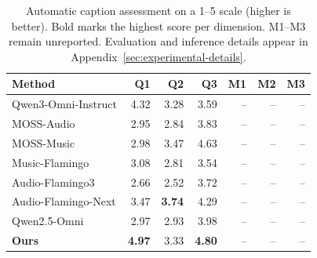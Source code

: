 \begin{table}[t]
\centering
\caption{Automatic caption assessment on a 1--5 scale (higher is better). Bold marks the highest score per dimension. M1--M3 remain unreported. Evaluation and inference details appear in Appendix~\ref{sec:experimental-details}.}
\label{tab:refinement-d123}
\begingroup\small
\setlength{\tabcolsep}{5pt}
\renewcommand{\arraystretch}{1.10}
\begin{tabular*}{\textwidth}{@{\extracolsep{\fill}}lrrrrrr@{}}
\toprule
Method & Q1 & Q2 & Q3 & M1 & M2 & M3 \\
\midrule
Qwen3-Omni-Instruct & 4.32 & 3.28 & 3.59 & -- & -- & -- \\
MOSS-Audio & 2.95 & 2.84 & 3.83 & -- & -- & -- \\
MOSS-Music & 2.98 & 3.47 & 4.63 & -- & -- & -- \\
Music-Flamingo & 3.08 & 2.81 & 3.54 & -- & -- & -- \\
Audio-Flamingo3 & 2.66 & 2.52 & 3.72 & -- & -- & -- \\
Audio-Flamingo-Next & 3.47 & \textbf{3.74} & 4.29 & -- & -- & -- \\
Qwen2.5-Omni & 2.97 & 2.93 & 3.98 & -- & -- & -- \\
\midrule
\textbf{Ours} & \textbf{4.97} & 3.33 & \textbf{4.80} & -- & -- & -- \\
\bottomrule
\end{tabular*}
\endgroup
\end{table}
